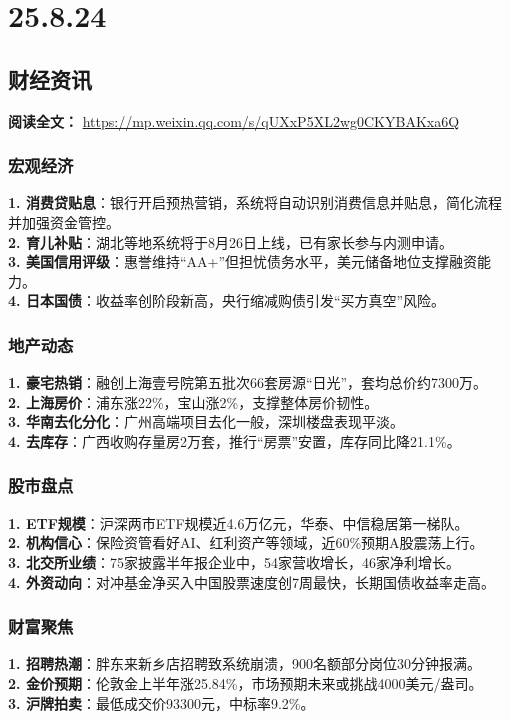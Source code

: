 \chapter{25.8.24}
\section{财经资讯}
\vspace{1em}
\noindent\textbf{阅读全文：} \url{https://mp.weixin.qq.com/s/qUXxP5XL2wg0CKYBAKxa6Q}
\subsection{宏观经济}
\textbf{1. 消费贷贴息}：银行开启预热营销，系统将自动识别消费信息并贴息，简化流程并加强资金管控。\\
\textbf{2. 育儿补贴}：湖北等地系统将于8月26日上线，已有家长参与内测申请。\\
\textbf{3. 美国信用评级}：惠誉维持“AA+”但担忧债务水平，美元储备地位支撑融资能力。\\
\textbf{4. 日本国债}：收益率创阶段新高，央行缩减购债引发“买方真空”风险。

\subsection{地产动态}
\textbf{1. 豪宅热销}：融创上海壹号院第五批次66套房源“日光”，套均总价约7300万。\\
\textbf{2. 上海房价}：浦东涨22\%，宝山涨2\%，支撑整体房价韧性。\\
\textbf{3. 华南去化分化}：广州高端项目去化一般，深圳楼盘表现平淡。\\
\textbf{4. 去库存}：广西收购存量房2万套，推行“房票”安置，库存同比降21.1\%。

\subsection{股市盘点}
\textbf{1. ETF规模}：沪深两市ETF规模近4.6万亿元，华泰、中信稳居第一梯队。\\
\textbf{2. 机构信心}：保险资管看好AI、红利资产等领域，近60\%预期A股震荡上行。\\
\textbf{3. 北交所业绩}：75家披露半年报企业中，54家营收增长，46家净利增长。\\
\textbf{4. 外资动向}：对冲基金净买入中国股票速度创7周最快，长期国债收益率走高。

\subsection{财富聚焦}
\textbf{1. 招聘热潮}：胖东来新乡店招聘致系统崩溃，900名额部分岗位30分钟报满。\\
\textbf{2. 金价预期}：伦敦金上半年涨25.84\%，市场预期未来或挑战4000美元/盎司。\\
\textbf{3. 沪牌拍卖}：最低成交价93300元，中标率9.2\%。

